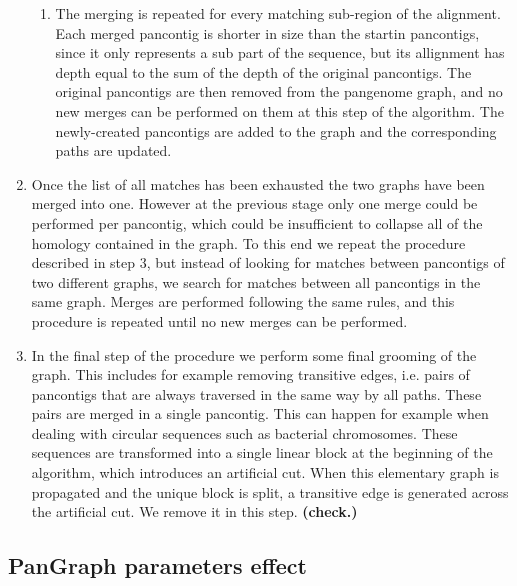 \documentclass[aps,rmp,reprint,superscriptaddress,notitlepage,10pt,onecolumn]{revtex4-1}
\begin{document}
\begin{enumerate}
\begin{enumerate}
              \item The merging is repeated for every matching sub-region of the alignment. Each merged pancontig is shorter in size than the startin pancontigs, since it only represents a sub part of the sequence, but its allignment has depth equal to the sum of the depth of the original pancontigs. The original pancontigs are then removed from the pangenome graph, and no new merges can be performed on them at this step of the algorithm. The newly-created pancontigs are added to the graph and the corresponding paths are updated.
          \end{enumerate}
    \item Once the list of all matches has been exhausted the two graphs have been merged into one. However at the previous stage only one merge could be performed per pancontig, which could be insufficient to collapse all of the homology contained in the graph. To this end we repeat the procedure described in step 3, but instead of looking for matches between pancontigs of two different graphs, we search for matches between all pancontigs in the same graph. Merges are performed following the same rules, and this procedure is repeated until no new merges can be performed.
    \item In the final step of the procedure we perform some final grooming of the graph. This includes for example removing transitive edges, i.e. pairs of pancontigs that are always traversed in the same way by all paths. These pairs are merged in a single pancontig. This can happen for example when dealing with circular sequences such as bacterial chromosomes. These sequences are transformed into a single linear block at the beginning of the algorithm, which introduces an artificial cut. When this elementary graph is propagated and the unique block is split, a transitive edge is generated across the artificial cut. We remove it in this step. \textbf{(check.)}
\end{enumerate}



\subsection*{PanGraph parameters effect}
\end{document}
